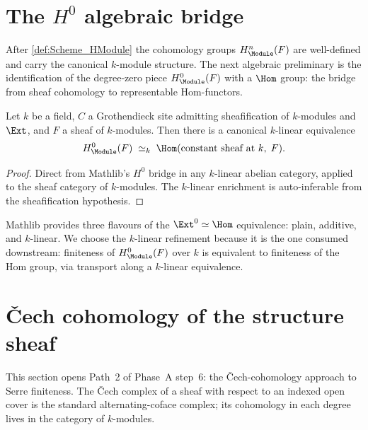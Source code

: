 \section{The \(H^0\) algebraic bridge}
\label{sec:HModule_zero}

After \cref{def:Scheme_HModule} the cohomology groups \(H^n_{\Module}(F)\) are well-defined and carry the canonical \(k\)-module structure. The next algebraic preliminary is the identification of the degree-zero piece \(H^0_{\Module}(F)\) with a \(\Hom\) group: the bridge from sheaf cohomology to representable Hom-functors.

\begin{definition}
  \label{def:Scheme_HModule_zero_linearEquiv}

  Let \(k\) be a field, \(C\) a Grothendieck site admitting sheafification of \(k\)-modules and \(\Ext\), and \(F\) a sheaf of \(k\)-modules. Then there is a canonical \(k\)-linear equivalence
  \[
    H^0_{\Module}(F) \;\simeq_k\; \Hom(\text{constant sheaf at }k,\; F).
  \]
\end{definition}

\begin{proof}
  
  \leanok
  Direct from Mathlib's \(H^0\) bridge in any \(k\)-linear abelian category, applied to the sheaf category of \(k\)-modules. The \(k\)-linear enrichment is auto-inferable from the sheafification hypothesis.
\end{proof}

\begin{remark}
  Mathlib provides three flavours of the \(\Ext^0 \simeq \Hom\) equivalence: plain, additive, and \(k\)-linear. We choose the \(k\)-linear refinement because it is the one consumed downstream: finiteness of \(H^0_{\Module}(F)\) over \(k\) is equivalent to finiteness of the Hom group, via transport along a \(k\)-linear equivalence.
\end{remark}

\section{\v{C}ech cohomology of the structure sheaf}
\label{sec:moduleK_cech}

This section opens Path~2 of Phase~A step~6: the \v{C}ech-cohomology approach to Serre finiteness. The \v{C}ech complex of a sheaf with respect to an indexed open cover is the standard alternating-coface complex; its cohomology in each degree lives in the category of \(k\)-modules.

